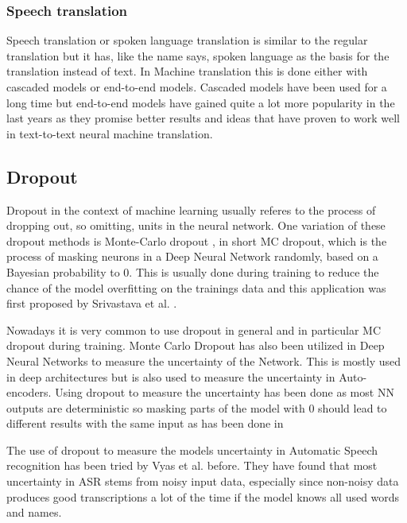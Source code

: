 \subsubsection{Speech translation}
Speech translation or spoken language translation is similar to the regular translation but it has, like the name says, spoken language as the basis for the translation instead of text. 
In Machine translation this is done either with cascaded models or end-to-end models.
Cascaded models have been used for a long time but end-to-end models have gained quite a lot more popularity in the last years as they promise better results and ideas that have proven to work well in text-to-text neural machine translation.



\subsection{Dropout}
Dropout in the context of machine learning usually referes to the process of dropping out, so omitting, units in the neural network. 
One variation of these dropout methods is Monte-Carlo dropout \cite{gal2016dropoutbayesianapproximationrepresenting}, in short MC dropout, which is the process of masking neurons in a Deep Neural Network randomly, based on a Bayesian probability to 0. 
This is usually done during training to reduce the chance of the model overfitting on the trainings data and this application was first proposed by Srivastava et al. \cite{JMLR:v15:srivastava14a}. 

Nowadays it is very common to use dropout in general and in particular MC dropout during training.
Monte Carlo Dropout has also been utilized in Deep Neural Networks to measure the uncertainty of the Network.   
This is mostly used in deep architectures but is also used to measure the uncertainty in Auto-encoders. \cite{gawlikowski2022surveyuncertaintydeepneural}
Using dropout to measure the uncertainty has been done as most NN outputs are deterministic so masking parts of the model with 0 should lead to different results with the same input as has been done in \cite{gal2016dropoutbayesianapproximationrepresenting}

The use of dropout to measure the models uncertainty in Automatic Speech recognition has been tried by Vyas et al. \cite{8683086} before.
They have found that most uncertainty in ASR stems from noisy input data, especially since non-noisy data produces good transcriptions a lot of the time if the model knows all used words and names. 

